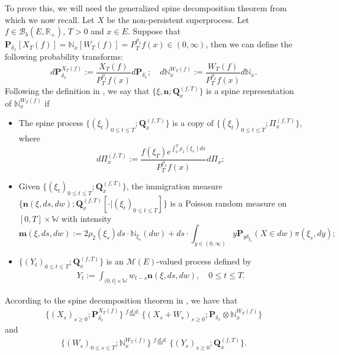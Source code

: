 \documentclass[12pt,a4paper]{amsart}
\theoremstyle{plain}
\theoremstyle{definition}
\numberwithin{equation}{section}
\begin{document}
    To prove this, we will need the generalized spine decomposition theorem from \cite{RenSongSun2017Spine} which we now recall.
    Let $X$ be the non-persistent superprocess.
    Let $f\in \mathcal B_b(E,\mathbb R_+)$, $T >0$ and $x\in E$.
    Suppose that $\mathbf P_{\delta_x}[X_T(f)] = \mathbb N_x[W_T(f)] = P^{\rho_1}_T f(x) \in (0,\infty)$, then we can define the following probability transforms:
\begin{equation}
    d\mathbf P_{\delta_x}^{X_T(f)}
    := \frac{X_T(f)}{P_T^{\rho_1} f(x)} d\mathbf P_{\delta_x};
    \quad d\mathbb N_x^{W_T(f)}
    :=  \frac{W_T(f)}{P_T^{\rho_1} f(x)} d\mathbb N_x.
\end{equation}
    Following the definition in \cite{RenSongSun2017Spine}, we say that $\{\xi, \mathbf n;\mathbf Q_{x}^{(f,T)}\}$ is a spine representation of $\mathbb N_x^{W_T(f)}$ if
\begin{itemize}
\item
    The spine process $\{(\xi_t)_{0\leq t\leq T}; \mathbf Q^{(f,T)}_x\}$ is a copy of $\{(\xi_t)_{0\leq t\leq T}; \Pi^{(f,T)}_{x}\}$,
    where
\begin{equation}
    d\Pi_x^{(f,T)} := \frac{f(\xi_T)e^{\int_0^T \rho_1(\xi_s)ds}}{P^{\rho_1}_T f(x)} d \Pi_x;
\end{equation}
\item
    Given $\{(\xi_t)_{0\leq t\leq T}; \mathbf Q^{(f,T)}_x\}$, the immigration measure $\{\mathbf n(\xi,ds,dw); \mathbf Q^{(f,T)}_x[\cdot |(\xi_t)_{0\leq t\leq T}]\}$ is a Poisson random measure on $[0,T] \times \mathbb W$ with intensity
\begin{equation}
\label{eq: conditional intensity}
    \mathbf m(\xi,ds,dw)
    := 2 \rho_2(\xi_s) ds \cdot \mathbb N_{\xi_s}(dw) + ds \cdot \int_{y\in (0,\infty)} y \mathbf P_{y\delta_{\xi_s}}(X\in dw) \pi(\xi_s,dy);
\end{equation}
\item
    $\{(Y_t)_{0\leq t\leq T}; \mathbf Q^{(f,T)}_x\}$ is an $\mathcal M(E)$-valued process defined by
\begin{equation}\begin{split}
    Y_t
    := \int_{(0,t] \times \mathbb W} w_{t-s} \mathbf n(\xi,ds,dw),
    \quad 0 \leq t\leq T.
\end{split}\end{equation}
\end{itemize}
    According to the spine decomposition theorem in \cite{RenSongSun2017Spine}, we have that
\begin{equation}\begin{split}
\label{eq: Spine decomposition 1}
    \{(X_s)_{s \geq 0};\mathbf P_{\delta_x}^{X_T(f)}\}
    \overset{f.d.d.}{=} \{(X_s + W_s)_{s \geq 0};\mathbf P_{\delta_x} \otimes \mathbb N_x^{W_T(f)} \}
\end{split}\end{equation}
    and
\begin{equation}\begin{split}
\label{eq: Spine decomposition 2}
    \{(W_s)_{0\leq s\leq T};\mathbb N_x^{W_T(f)}\}
    \overset{f.d.d.}{=} \{(Y_s)_{s \geq 0};\mathbf Q_x^{(f,T)}\}.
\end{split}\end{equation}
\end{document}
